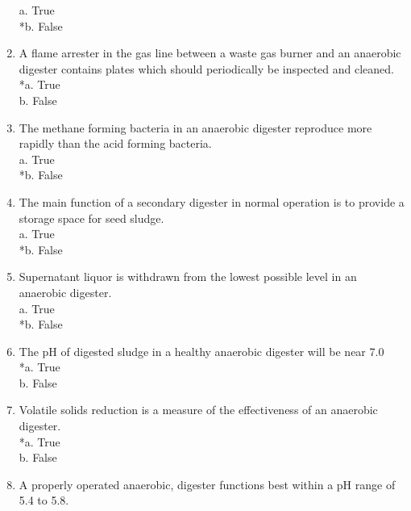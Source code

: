 \documentclass{article}
\begin{document}
\begin{enumerate}
a. True \\
*b. False \\

\item  A flame arrester in the gas line between a waste gas burner and an anaerobic digester contains plates which should periodically be inspected and cleaned. \\

*a. True \\
b. False \\

\item  The methane forming bacteria in an anaerobic digester reproduce more rapidly than the acid forming bacteria. \\

a. True \\
*b. False \\

\item  The main function of a secondary digester in normal operation is to provide a storage space for seed sludge. \\

a. True \\
*b. False \\

\item  Supernatant liquor is withdrawn from the lowest possible level in an anaerobic digester. \\

a. True \\
*b. False \\

\item  The pH of digested sludge in a healthy anaerobic digester will be near 7.0 \\

*a. True \\
b. False \\

\item  Volatile solids reduction is a measure of the effectiveness of an anaerobic digester. \\

*a. True \\
b. False \\

\item  A properly operated anaerobic, digester functions best within a pH range of 5.4 to 5.8. \\


\end{enumerate}
\end{document}
